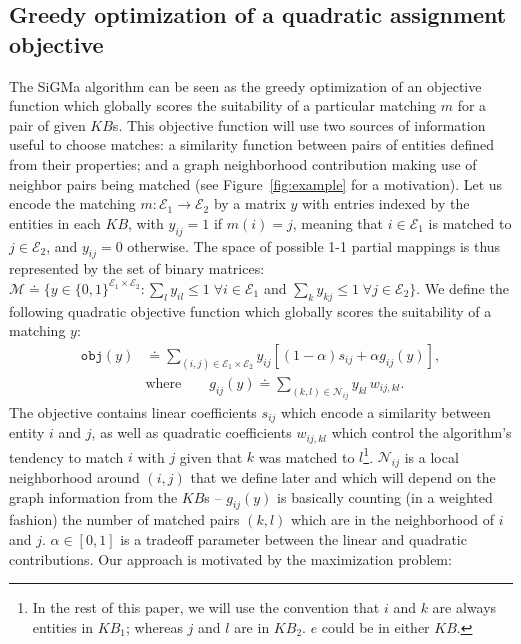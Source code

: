 \documentclass{sig-alternate}
\newcommand{\KB}{K\!B}
\begin{document}
\subsection{Greedy optimization of a quadratic assignment objective} \label{ssec:greedy}
%
The \textsf{SiGMa} algorithm can be seen as the greedy optimization of an objective function which globally scores the suitability of a particular matching $m$ for a pair of given $\KB$s. This objective function will use two sources of information useful to choose matches: a similarity function between pairs of entities defined from their properties; and a graph neighborhood contribution making use of neighbor pairs being matched (see Figure~\ref{fig:example} for a motivation). Let us encode the matching $m : \mathcal{E}_1 \rightarrow \mathcal{E}_2 $ by a matrix $y$ with entries indexed by the entities in each $\KB$, with $y_{ij} = 1$ if $m(i) = j$, meaning that $i \in \mathcal{E}_1$ is matched to $j \in \mathcal{E}_2$, and $y_{ij} = 0$ otherwise. The space of possible 1-1 partial mappings is thus represented by the set of binary matrices: $\mathcal{M} \doteq \{y \in \{0,1\}^{\mathcal{E}_1 \times \mathcal{E}_2} : \sum_{l} y_{il} \leq 1 \; \forall i \in \mathcal{E}_1$ and $\sum_{k} y_{kj} \leq 1 \; \forall{j} \in \mathcal{E}_2\}$. We define the following quadratic objective function which globally scores the suitability of a matching $y$:
\begin{equation} \label{eq:obj}
    \begin{split}
    \texttt{obj}(y) & \doteq \sum_{(i,j) \in \mathcal{E}_1  \times \mathcal{E}_2} y_{ij} \left[ (1-\alpha) s_{ij} + \alpha g_{ij}(y) \right], \\
    & \textrm{where} \qquad g_{ij}(y) \doteq \sum_{(k,l) \in \mathcal{N}_{ij}} y_{kl} \, w_{ij,kl}.
    \end{split}
\end{equation}
The objective contains linear coefficients $s_{ij}$ which encode a similarity between entity $i$ and $j$, as well as quadratic coefficients $w_{ij,kl}$ which control the algorithm's tendency to match $i$ with $j$ given that $k$ was matched to $l$\footnote{In the rest of this paper, we will use the convention that $i$ and $k$ are always entities in $\KB_1$; whereas $j$ and $l$ are in $\KB_2$. $e$ could be in either $\KB$.}. $\mathcal{N}_{ij}$ is a local neighborhood around $(i,j)$ that we define later and which will depend on the graph information from the $\KB$s -- $g_{ij}(y)$ is basically counting (in a weighted fashion) the number of matched pairs $(k,l)$ which are in the neighborhood of $i$ and $j$. $\alpha \in [0,1]$ is a tradeoff parameter between the linear and quadratic contributions. Our approach is motivated by the maximization problem:
\end{document}
